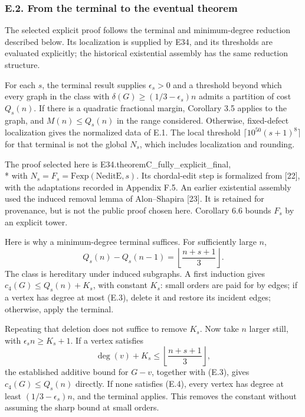 \documentclass[english,11pt,a4paper]{article}
\newcounter{none}
\begin{document}
\subsubsection{E.2. From the terminal to the eventual theorem}\label{e.2.-from-the-terminal-to-the-eventual-theorem}

The selected explicit proof follows the terminal and minimum-degree reduction described below. Its localization is supplied by E34, and its thresholds are evaluated explicitly; the historical existential assembly has the same reduction structure.

For each \(s\), the terminal result supplies \(\epsilon_s>0\) and a threshold beyond which every graph in the class with \(\delta(G)\ge(1/3-\epsilon_s)n\) admits a partition of cost \(Q_s(n)\). If there is a quadratic fractional margin, Corollary 3.5 applies to the graph, and \(M(n)\le Q_s(n)\) in the range considered. Otherwise, fixed-defect localization gives the normalized data of E.1. The local threshold \(\lceil10^{50}(s+1)^8\rceil\) for that terminal is not the global \(N_s\), which includes localization and rounding.

The proof selected here is {\ttfamily\small E34.\discretionary{\hbox{\ensuremath{\hookrightarrow}}}{}{}theoremC\_\discretionary{\hbox{\ensuremath{\hookrightarrow}}}{}{}fully\_\discretionary{\hbox{\ensuremath{\hookrightarrow}}}{}{}explicit\_\discretionary{\hbox{\ensuremath{\hookrightarrow}}}{}{}final},\\* with \(N_s=F_s=\mathrm{Fexp}(\mathrm{NeditE},s)\). Its chordal-edit step is formalized from {[}22{]}, with the adaptations recorded in Appendix F.5. An earlier existential assembly used the induced removal lemma of Alon--Shapira {[}23{]}. It is retained for provenance, but is not the public proof chosen here. Corollary 6.6 bounds \(F_s\) by an explicit tower.

Here is why a minimum-degree terminal suffices. For sufficiently large \(n\), \[
Q_s(n)-Q_s(n-1)=\left\lfloor\frac{n+s+1}{3}\right\rfloor.
\tag{E.3}
\] The class is hereditary under induced subgraphs. A first induction gives \(c_4(G)\le Q_s(n)+K_s\), with constant \(K_s\): small orders are paid for by edges; if a vertex has degree at most (E.3), delete it and restore its incident edges; otherwise, apply the terminal.

Repeating that deletion does not suffice to remove \(K_s\). Now take \(n\) larger still, with \(\epsilon_s n\ge K_s+1\). If a vertex satisfies \[
\deg(v)+K_s\le\left\lfloor\frac{n+s+1}{3}\right\rfloor,
\tag{E.4}
\] the established additive bound for \(G-v\), together with (E.3), gives \(c_4(G)\le Q_s(n)\) directly. If none satisfies (E.4), every vertex has degree at least \((1/3-\epsilon_s)n\), and the terminal applies. This removes the constant without assuming the sharp bound at small orders.
\end{document}
